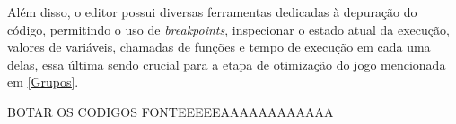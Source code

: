 Além disso, o editor possui diversas ferramentas dedicadas à depuração do código, permitindo o uso de \textit{breakpoints}, inspecionar o estado atual da execução, valores de variáveis, chamadas de funções e tempo de execução em cada uma delas, essa última sendo crucial para a etapa de otimização do jogo mencionada em \ref{Grupos}.


BOTAR OS CODIGOS FONTEEEEEAAAAAAAAAAAA